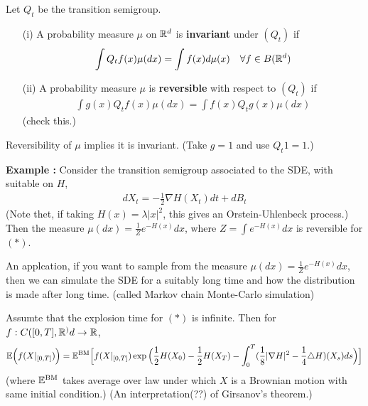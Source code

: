 \documentclass[10pt,a4paper]{article}
\begin{document}
 Let $Q_t$ be the transition semigroup.
\begin{itemize}
\item[(i)] A probability measure $\mu$ on $\mathbb{R}^d$ is \textbf{invariant} under $(Q_t)$ if
\begin{align*}
\int Q_t f(x) \mu(dx) = \int f(x) d\mu(x) \quad \forall f\in B(\mathbb{R}^d)
\end{align*} 
\item[(ii)] A probability measure $\mu$ is \textbf{reversible} with respect to $(Q_t)$ if
\begin{align*}
\int g(x) Q_t f(x) \mu(dx) = \int f(x) Q_t g(x) \mu(dx)
\end{align*}
(check this.) 
\end{itemize}
\s

\fact Reversibility of $\mu$ implies it is invariant. (Take $g=1$ and use $Q_t 1=1$.)
\s

\textbf{Example :} Consider the transition semigroup associated to the SDE, with suitable on $H$,
\begin{align*}
dX_t = -\frac{1}{2}\nabla H(X_t) dt + dB_t
\end{align*}
(Note thet, if taking $H(x)=\lambda |x|^2$, this gives an Orstein-Uhlenbeck process.) Then the measure $\mu(dx) = \frac{1}{Z} e^{-H(x)}dx$, where $Z= \int e^{-H(x)}dx$ is reversible for $(*)$.

\quad An applcation, if you want to sample from the measure $\mu(dx) = \frac{1}{Z} e^{-H(x)}dx$, then we can simulate the SDE for a suitably long time and how the distribution is made after long time. (called Markov chain Monte-Carlo simulation)
\s

\lem Assumte that the explosion time for $(*)$ is infinite. Then for $f: C([0, T], \mathbb{R}^)d\rightarrow \mathbb{R}$,
\begin{align*}
\mathbb{E} \Big( f(X|_{[0, T]}) \Big) = \mathbb{E}^{\text{BM}} \Big[ f(X|_{[0,T]}) \exp \Big( \frac{1}{2} H(X_0) - \frac{1}{2} H(X_T) - \int_0^T (\frac{1}{8} |\nabla H|^2 - \frac{1}{4} \triangle H) (X_s) ds \Big) \Big]
\end{align*}
(where $\mathbb{E}^{\text{BM}}$ takes average over law under which $X$ is a Brownian motion with same initial condition.)
(An interpretation(??) of Girsanov's theorem.)
\end{document}
